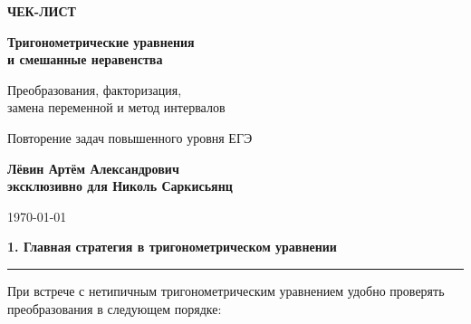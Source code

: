 \documentclass[a4paper,12pt]{article}
\newcommand{\checktitle}[1]{%
    \vspace{0.4em}
    {\Large\bfseries\textcolor{darkaccent}{#1}}\par
    \vspace{0.25em}
    {\color{accent!55}\rule{\linewidth}{0.6pt}}
    \vspace{0.45em}
}
\begin{document}
\begin{titlepage}
\thispagestyle{empty}

\begin{center}

\vspace*{2.3cm}

{\Large\textcolor{accent}{\textbf{ЧЕК-ЛИСТ}}}

\vspace{0.7cm}

{\huge\bfseries
Тригонометрические уравнения\\[0.25cm]
и смешанные неравенства
}

\vspace{0.6cm}

{\Large\textcolor{darkaccent}{
Преобразования, факторизация,\\
замена переменной и метод интервалов
}}

\vspace{1.3cm}

{\large
Повторение задач повышенного уровня ЕГЭ
}

\vfill

{\large\bfseries
Лёвин Артём Александрович\\[0.15cm]
эксклюзивно для Николь Саркисьянц
}

\vspace{0.7cm}

{\large \today}

\vfill


\vspace{0.4cm}

\end{center}
\end{titlepage}


\checktitle{1. Главная стратегия в тригонометрическом уравнении}

При встрече с нетипичным тригонометрическим уравнением удобно проверять преобразования в следующем порядке:
\end{document}
